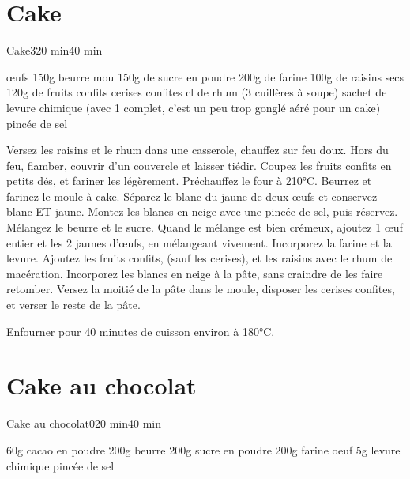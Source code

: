 {\section{Cake}
\begin{recette}{Cake}{3}{20 min}{40 min}
\begin{ingredients}
 œufs
\ingredient 150g beurre mou
\ingredient 150g de sucre en poudre
\ingredient 200g de farine
\ingredient 100g de raisins secs
\ingredient 120g de fruits confits
\ingredient cerises confites
 cl de rhum (3 cuillères à soupe)
 sachet de levure chimique (avec 1 complet, c'est un peu trop gonglé aéré pour un cake)
 pincée de sel
\end{ingredients}

\begin{preparation}
\etape Versez les raisins et le rhum dans une casserole, chauffez sur feu doux. Hors du feu, flamber, couvrir d'un couvercle et 
laisser tiédir.
\etape Coupez les fruits confits en petits dés, et fariner les légèrement.
\etape Préchauffez le four à 210°C. Beurrez et farinez le moule à cake.
\etape Séparez le blanc du jaune de deux œufs et conservez blanc ET jaune.
\etape Montez les blancs en neige avec une pincée de sel, puis réservez.
\etape Mélangez le beurre et le sucre. 
\etape Quand le mélange est bien crémeux, ajoutez 1 œuf entier et les 2 jaunes d'œufs, en 
mélangeant vivement.
\etape Incorporez la farine et la levure.
\etape Ajoutez les fruits confits, (sauf les cerises), et les raisins avec le rhum de macération.
\etape Incorporez les blancs en neige à la pâte, sans craindre de les faire retomber.
\etape Versez la moitié de la pâte dans le moule, disposer les cerises confites, et verser le reste de la pâte.

\end{preparation}

\begin{cuisson}
Enfourner pour 40 minutes de cuisson environ à 180°C. 
\end{cuisson}
\end{recette}


\section{Cake au chocolat}
\begin{recette}{Cake au chocolat}{0}{20 min}{40 min}
\begin{ingredients}
\ingredient 60g cacao en poudre
\ingredient 200g beurre
\ingredient 200g sucre en poudre
\ingredient 200g farine
 oeuf
\ingredient 5g levure chimique
 pincée de sel
\end{ingredients}


\end{recette}}
